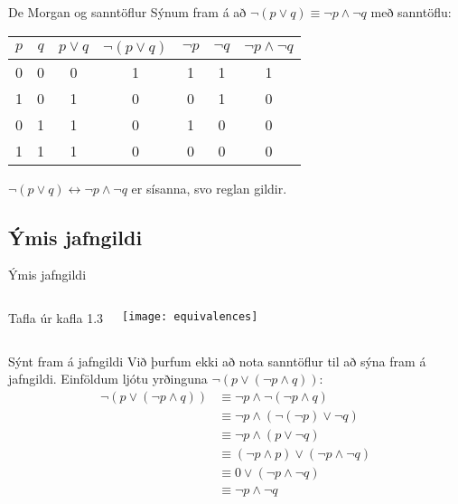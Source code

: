 \documentclass[handout]{beamer}
\begin{document}
\begin{frame}{De Morgan og sanntöflur}
Sýnum fram á að $\lnot (p \lor q ) \equiv \lnot p \land \lnot q$ með sanntöflu: \pause
\begin{center}
\begin{tabular}{ccccccc}
\toprule
$p$&$q$&$p \lor q$&$\lnot(p \lor q)$&$\lnot p$&$\lnot q$&$\lnot p \land \lnot q$\\
\midrule
0&0&0&1&1&1&1\\
1&0&1&0&0&1&0\\
0&1&1&0&1&0&0\\
1&1&1&0&0&0&0\\
\bottomrule
\end{tabular}
\end{center}
$\lnot (p \lor q ) \leftrightarrow \lnot p \land \lnot q$ er sísanna, svo reglan gildir.
\end{frame}

\subsection{Ýmis jafngildi}

\begin{frame}{Ýmis jafngildi}
\begin{columns}
Tafla úr kafla 1.3
\begin{center}
\texttt{[image: equivalences]}
\end{center}
\end{columns}
\end{frame}

\begin{frame}{Sýnt fram á jafngildi}
Við þurfum ekki að nota sanntöflur til að sýna fram á jafngildi. Einföldum ljótu yrðinguna $\lnot (p \lor (\lnot p \land q))$: \pause
\begin{align*}
\lnot (p \lor (\lnot p \land q)) &\equiv \lnot p \land \lnot ( \lnot p \land q)\\
&\equiv \lnot p \land (\lnot (\lnot p) \lor \lnot q)\\
&\equiv \lnot p \land (p \lor \lnot q)\\
&\equiv (\lnot p \land p ) \lor (\lnot p \land \lnot q)\\
&\equiv 0 \lor (\lnot p \land \lnot q)\\
&\equiv \lnot p \land \lnot q
\end{align*}
\end{frame}
\end{document}
